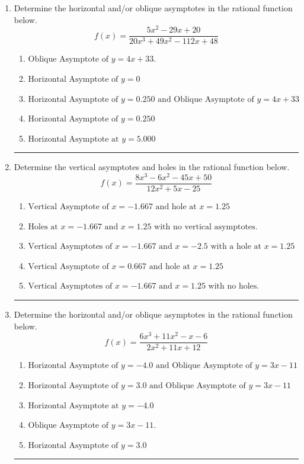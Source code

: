 \documentclass[14pt]{extbook}
\newcommand{\litem}[1]{\item#1\hspace*{-1cm}\rule{\textwidth}{0.4pt}}
\begin{document}
\begin{enumerate}
{\begin{enumerate}[label=\Alph*.]
\end{enumerate} }
\litem{
Determine the horizontal and/or oblique asymptotes in the rational function below.\[ f(x) = \frac{5x^{2} -29 x + 20}{20x^{3} +49 x^{2} -112 x + 48} \]\begin{enumerate}[label=\Alph*.]
\item \( \text{Oblique Asymptote of } y = 4x + 33. \)
\item \( \text{Horizontal Asymptote of } y = 0 \)
\item \( \text{Horizontal Asymptote of } y = 0.250 \text{ and Oblique Asymptote of } y = 4x + 33 \)
\item \( \text{Horizontal Asymptote of } y = 0.250  \)
\item \( \text{Horizontal Asymptote at } y = 5.000 \)

\end{enumerate} }
\litem{
Determine the vertical asymptotes and holes in the rational function below.\[ f(x) = \frac{8x^{3} -6 x^{2} -45 x + 50}{12x^{2} +5 x -25} \]\begin{enumerate}[label=\Alph*.]
\item \( \text{Vertical Asymptote of } x = -1.667 \text{ and hole at } x = 1.25 \)
\item \( \text{Holes at } x = -1.667 \text{ and } x = 1.25 \text{ with no vertical asymptotes.} \)
\item \( \text{Vertical Asymptotes of } x = -1.667 \text{ and } x = -2.5 \text{ with a hole at } x = 1.25 \)
\item \( \text{Vertical Asymptote of } x = 0.667 \text{ and hole at } x = 1.25 \)
\item \( \text{Vertical Asymptotes of } x = -1.667 \text{ and } x = 1.25 \text{ with no holes.} \)

\end{enumerate} }
\litem{
Determine the horizontal and/or oblique asymptotes in the rational function below.\[ f(x) = \frac{6x^{3} +11 x^{2} -x -6}{2x^{2} +11 x + 12} \]\begin{enumerate}[label=\Alph*.]
\item \( \text{Horizontal Asymptote of } y = -4.0 \text{ and Oblique Asymptote of } y = 3x -11 \)
\item \( \text{Horizontal Asymptote of } y = 3.0 \text{ and Oblique Asymptote of } y = 3x -11 \)
\item \( \text{Horizontal Asymptote at } y = -4.0 \)
\item \( \text{Oblique Asymptote of } y = 3x -11. \)
\item \( \text{Horizontal Asymptote of } y = 3.0  \)


\end{enumerate}}
\end{enumerate}
\end{document}
